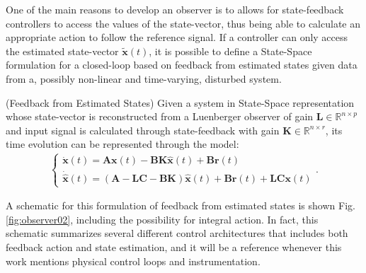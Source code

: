\documentclass[a4paper,11pt]{book}
\numberwithin{figure}{chapter}
\numberwithin{equation}{chapter}
\numberwithin{table}{chapter}
\theoremstyle{definition}
\newtheorem{definition}{Definition}[chapter]
\newcounter{boxed-theorem}
\newcounter{boxed-definition}
\newenvironment{boxed-definition}[1]
{\colorlet{shadecolor}{pastelYellow!15} \begin{shaded} \begin{definition}{#1}}
{\end{definition} \end{shaded}}
\newcounter{boxed-example}
\begin{document}
One of the main reasons to develop an observer is to allows for state-feedback controllers to access the values of the state-vector, thus being able to calculate an appropriate action to follow the reference signal. If a controller can only access the estimated state-vector $\tilde{\bm{x}}(t)$, it is possible to define a State-Space formulation for a closed-loop based on feedback from estimated states given data from a, possibly non-linear and time-varying, disturbed system.

\begin{boxed-definition}{(Feedback from Estimated States)} \label{def:fdbckLuenberger}
    Given a system in State-Space representation whose state-vector is reconstructed from a Luenberger observer of gain $\bm{L} \in \mathbb{R}^{n \times p}$ and input signal is calculated through state-feedback with gain $\bm{K} \in \mathbb{R}^{n \times r}$, its time evolution can be represented through the model:
    \begin{align} \label{eq:fdbckLuenberger01}
    \begin{cases}
        \dot{\bm{x}}(t) = \bm{A} \bm{x}(t) - \bm{B} \bm{K} \hat{\bm{x}}(t) + \bm{B} \bm{r}(t) \\
        \dot{\hat{\bm{x}}}(t) = \left(\bm{A} - \bm{L} \bm{C} - \bm{B} \bm{K} \right) \hat{\bm{x}}(t) + \bm{B} \bm{r}(t) + \bm{L} \bm{C} \bm{x}(t) 
    \end{cases}
    .\end{align}
\end{boxed-definition} 

A schematic for this formulation of feedback from estimated states is shown Fig. \ref{fig:observer02}, including the possibility for integral action. In fact, this schematic summarizes several different control architectures that includes both feedback action and state estimation, and it will be a reference whenever this work mentions physical control loops and instrumentation.
\end{document}
